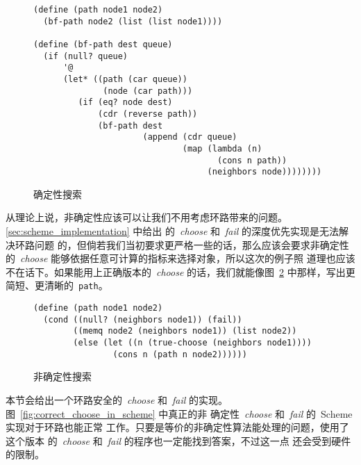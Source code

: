 \begin{figure}
\begin{lstlisting}
(define (path node1 node2)
  (bf-path node2 (list (list node1))))

(define (bf-path dest queue)
  (if (null? queue)
      '@
      (let* ((path (car queue))
              (node (car path)))
         (if (eq? node dest)
             (cdr (reverse path))
             (bf-path dest
                      (append (cdr queue)
                              (map (lambda (n)
                                     (cons n path))
                                   (neighbors node))))))))
\end{lstlisting}
\caption{确定性搜索}
\label{fig:deterministic_search}
\end{figure}

从理论上说，非确定性应该可以让我们不用考虑环路带来的问题。
\ref{sec:scheme_implementation} 中给出
的~\emph{choose} 和~\emph{fail} 的深度优先实现是无法解决环路问题
的，但倘若我们当初要求更严格一些的话，那么应该会要求非确定性
的~\emph{choose} 能够依据任意可计算的指标来选择对象，所以这次的例子照
道理也应该不在话下。如果能用上正确版本的~\emph{choose} 的话，我们就能像图~\ref{fig:nondeterministic_search} 中那样，写出更简短、更清晰的~\texttt{path}。


\begin{figure}
\begin{lstlisting}
(define (path node1 node2)
  (cond ((null? (neighbors node1)) (fail))
        ((memq node2 (neighbors node1)) (list node2))
        (else (let ((n (true-choose (neighbors node1))))
                (cons n (path n node2))))))
\end{lstlisting}
\caption{非确定性搜索}
\label{fig:nondeterministic_search}
\end{figure}

本节会给出一个环路安全的~\emph{choose} 和~\emph{fail} 的实现。
图~\ref{fig:correct_choose_in_scheme} 中真正的非
确定性~\emph{choose} 和~\emph{fail} 的~Scheme 实现对于环路也能正常
工作。只要是等价的非确定性算法能处理的问题，使用了这个版本
的~\emph{choose} 和~\emph{fail} 的程序也一定能找到答案，不过这一点
还会受到硬件的限制。

